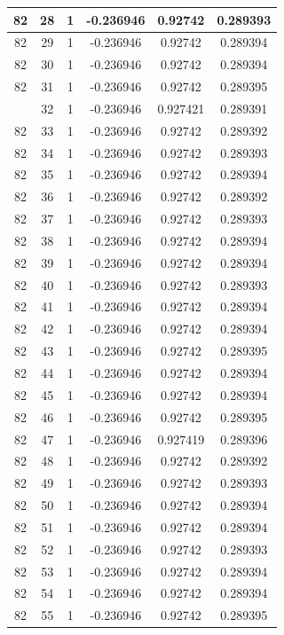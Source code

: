 \documentclass[12pt,a4paper]{article}
\numberwithin{equation}{section}
\numberwithin{figure}{section}
\numberwithin{table}{section}
\begin{document}
\begin{longtable}{|c|c|c|c|c|c|}
82 & 28 & 1 & -0.236946 & 0.92742 & 0.289393 \\ \hline
82 & 29 & 1 & -0.236946 & 0.92742 & 0.289394 \\ \hline
82 & 30 & 1 & -0.236946 & 0.92742 & 0.289394 \\ \hline
82 & 31 & 1 & -0.236946 & 0.92742 & 0.289395 \\ \hline
\pagebreak
82 & 32 & 1 & -0.236946 & 0.927421 & 0.289391 \\ \hline
82 & 33 & 1 & -0.236946 & 0.92742 & 0.289392 \\ \hline
82 & 34 & 1 & -0.236946 & 0.92742 & 0.289393 \\ \hline
82 & 35 & 1 & -0.236946 & 0.92742 & 0.289394 \\ \hline
82 & 36 & 1 & -0.236946 & 0.92742 & 0.289392 \\ \hline
82 & 37 & 1 & -0.236946 & 0.92742 & 0.289393 \\ \hline
82 & 38 & 1 & -0.236946 & 0.92742 & 0.289394 \\ \hline
82 & 39 & 1 & -0.236946 & 0.92742 & 0.289394 \\ \hline
82 & 40 & 1 & -0.236946 & 0.92742 & 0.289393 \\ \hline
82 & 41 & 1 & -0.236946 & 0.92742 & 0.289394 \\ \hline
82 & 42 & 1 & -0.236946 & 0.92742 & 0.289394 \\ \hline
82 & 43 & 1 & -0.236946 & 0.92742 & 0.289395 \\ \hline
82 & 44 & 1 & -0.236946 & 0.92742 & 0.289394 \\ \hline
82 & 45 & 1 & -0.236946 & 0.92742 & 0.289394 \\ \hline
82 & 46 & 1 & -0.236946 & 0.92742 & 0.289395 \\ \hline
82 & 47 & 1 & -0.236946 & 0.927419 & 0.289396 \\ \hline
82 & 48 & 1 & -0.236946 & 0.92742 & 0.289392 \\ \hline
82 & 49 & 1 & -0.236946 & 0.92742 & 0.289393 \\ \hline
82 & 50 & 1 & -0.236946 & 0.92742 & 0.289394 \\ \hline
82 & 51 & 1 & -0.236946 & 0.92742 & 0.289394 \\ \hline
82 & 52 & 1 & -0.236946 & 0.92742 & 0.289393 \\ \hline
82 & 53 & 1 & -0.236946 & 0.92742 & 0.289394 \\ \hline
82 & 54 & 1 & -0.236946 & 0.92742 & 0.289394 \\ \hline
82 & 55 & 1 & -0.236946 & 0.92742 & 0.289395 \\ \hline

\end{longtable}
\end{document}

